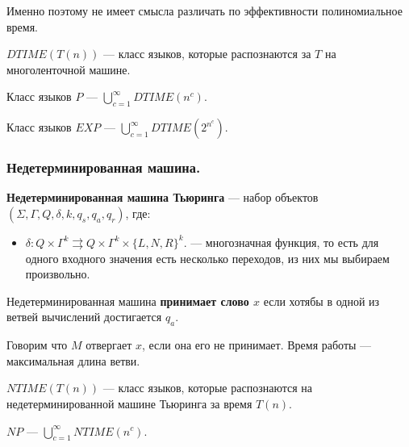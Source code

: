 \begin{note}
    Именно поэтому не имеет смысла различать по эффективности полиномиальное время. 
\end{note}

\begin{Def}
    $DTIME(T(n))$ ---  класс языков, которые распознаются за $T$ на многоленточной машине.
\end{Def}

\begin{Def}
    Класс языков $P$ ---  $\bigcup \limits_{c = 1}^{\infty} DTIME(n^c)$.
\end{Def}

\begin{Def}
    Класс языков $EXP$ ---  $\bigcup \limits_{c = 1}^{\infty} DTIME(2^{n^c})$.
\end{Def}

\subsubsection{Недетерминированная машина.}
\begin{Def}
    \textbf{Недетерминированная машина Тьюринга} --- набор объектов $(\Sigma, \Gamma, Q, \delta, k, q_s, q_a, q_r)$, где:
    \begin{itemize}
        \item $\delta: Q \times \Gamma ^ k \rightrightarrows Q \times \Gamma ^k \times \{L, N, R\} ^ k$. --- многозначная функция, 
            то есть для одного входного значения есть несколько переходов, из них мы выбираем произвольно. 
    \end{itemize}
\end{Def}

\begin{Def}
   Недетерминированная машина \textbf{принимает слово $x$} если хотябы в одной из ветвей вычислений достигается $q_a$. 
\end{Def}
\begin{Def}
   Говорим что $M$ отвергает  $x$, если она его не принимает. 
   Время работы --- максимальная длина ветви.
\end{Def}

\begin{Def}
    $NTIME(T(n))$ --- класс языков, которые распознаются на недетерминированной машине Тьюринга за время  $T(n)$.
\end{Def}

\begin{Def}
    $NP$ --- $\bigcup \limits_{c = 1}^{\infty} NTIME(n^c)$.
\end{Def}

